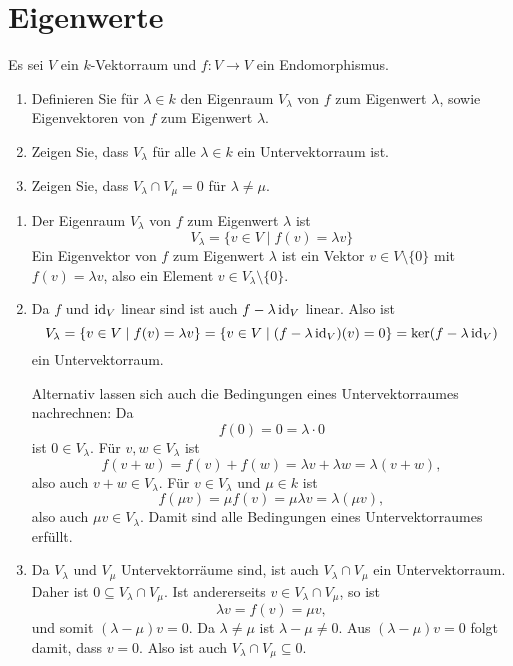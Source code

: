 \section{Eigenwerte}


\begin{question}
 Es sei $V$ ein $k$-Vektorraum und $f \colon V \to V$ ein Endomorphismus.
 \begin{enumerate}
  \item
   Definieren Sie für $\lambda \in k$ den Eigenraum $V_\lambda$ von $f$ zum Eigenwert $\lambda$, sowie Eigenvektoren von $f$ zum Eigenwert $\lambda$.
  \item
   Zeigen Sie, dass $V_\lambda$ für alle $\lambda \in k$ ein Untervektorraum ist.
  \item
   Zeigen Sie, dass $V_\lambda \cap V_\mu = 0$ für $\lambda \neq \mu$.
 \end{enumerate}
\end{question}
\begin{solution}
 \begin{enumerate}
  \item
   Der Eigenraum $V_\lambda$ von $f$ zum Eigenwert $\lambda$ ist
   \[
    V_\lambda = \{v \in V \mid f(v) = \lambda v\}
   \]
   Ein Eigenvektor von $f$ zum Eigenwert $\lambda$ ist ein Vektor $v \in V \setminus \{0\}$ mit $f(v) = \lambda v$, also ein Element $v \in V_\lambda \setminus \{0\}$.
  \item
   Da $f$ und $\operatorname{id}_V$ linear sind ist auch $f - \lambda \operatorname{id}_V$ linear. Also ist
   \[
    V_\lambda
    = \{v \in V \mid f(v) = \lambda v\}
    = \{v \in V \mid (f - \lambda \operatorname{id}_V)(v) = 0\}
    = \ker (f - \lambda \operatorname{id}_V)
   \]
   ein Untervektorraum.
   
   Alternativ lassen sich auch die Bedingungen eines Untervektorraumes nachrechnen: Da
   \[
    f(0) = 0 = \lambda \cdot 0
   \]
   ist $0 \in V_\lambda$. Für $v, w \in V_\lambda$ ist
   \[
    f(v + w) = f(v) + f(w) = \lambda v + \lambda w = \lambda (v + w),
   \]
   also auch $v + w \in V_\lambda$. Für $v \in V_\lambda$ und $\mu \in k$ ist
   \[
    f(\mu v) = \mu f(v) = \mu \lambda v = \lambda (\mu v),
   \]
   also auch $\mu v \in V_\lambda$. Damit sind alle Bedingungen eines Untervektorraumes erfüllt.
  \item
   Da $V_\lambda$ und $V_\mu$ Untervektorräume sind, ist auch $V_\lambda \cap V_\mu$ ein Untervektorraum. Daher ist $0 \subseteq V_\lambda \cap V_\mu$. Ist andererseits $v \in V_\lambda \cap V_\mu$, so ist
   \[
    \lambda v = f(v) = \mu v,
   \]
   und somit $(\lambda - \mu) v = 0$. Da $\lambda \neq \mu$ ist $\lambda - \mu \neq 0$. Aus $(\lambda - \mu) v = 0$ folgt damit, dass $v = 0$. Also ist auch $V_\lambda \cap V_\mu \subseteq 0$.
 \end{enumerate}
\end{solution}


